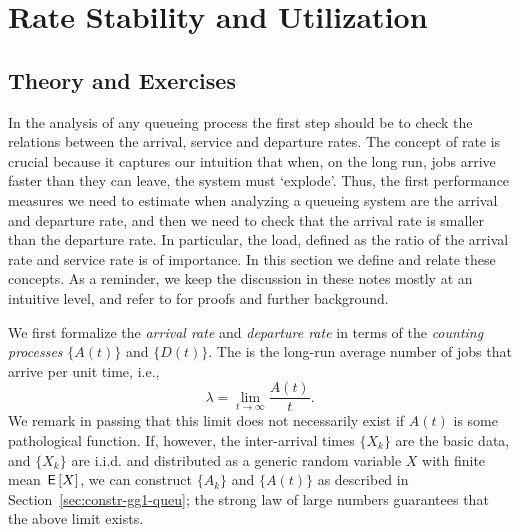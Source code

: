 \section{Rate Stability and Utilization}
\label{sec:rate-stability}

\subsection*{Theory and Exercises}


In the analysis of any queueing process the first step should be to
check the relations between the arrival, service and departure
rates. The concept of rate is crucial because it captures our
intuition that when, on the long run, jobs arrive faster than they can
leave, the system must `explode'. Thus, the first performance measures
we need to estimate when analyzing a queueing system are the arrival
and departure rate, and then we need to check that the arrival rate is
smaller than the departure rate. In particular, the load, defined as
the ratio of the arrival rate and service rate is of importance. In
this section we define and relate these concepts.  As a reminder, we
keep the discussion in these notes mostly at an intuitive level, and
refer to \cite{el-taha98:_sampl_path_analy_queuein_system} for proofs
and further background.


We first formalize the \emph{arrival rate} and \emph{departure rate}
in terms of the \emph{counting processes} $\{A(t)\}$ and $\{D(t)\}$.
The  is the long-run average number of jobs that
arrive per unit time, i.e.,
\begin{equation}
  \label{eq:3}
  \lambda = \lim_{t\to\infty} \frac{A(t)}t.
\end{equation}
We remark in passing that this limit does not necessarily exist if
$A(t)$ is some pathological function. If, however, the inter-arrival
times $\{X_k\}$ are the basic data, and $\{X_k\}$ are i.i.d.  and
distributed as a generic random variable $X$ with finite mean $\,\mathsf{E}\left[X\right]$,
we can construct $\{A_k\}$ and $\{A(t)\}$ as described in
Section~\ref{sec:constr-gg1-queu}; the strong law of large numbers
guarantees that the above limit exists.

